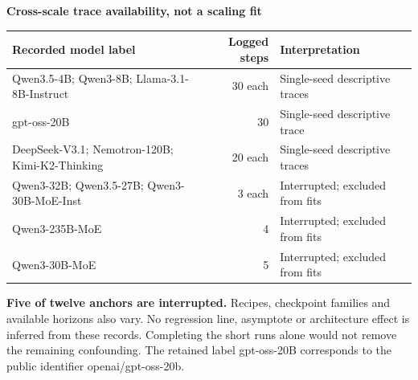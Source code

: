 \documentclass[border=8pt]{standalone}
\begin{document}
\begin{minipage}{15.2cm}\sffamily\small
{\Large\bfseries\color{ink} Cross-scale trace availability, not a scaling fit}\par\medskip
\begin{tabular}{@{}p{8.1cm}rp{4.6cm}@{}}\toprule
Recorded model label & Logged steps & Interpretation\\\midrule
Qwen3.5-4B; Qwen3-8B; Llama-3.1-8B-Instruct & 30 each & Single-seed descriptive traces\\
gpt-oss-20B & 30 & Single-seed descriptive trace\\
DeepSeek-V3.1; Nemotron-120B; Kimi-K2-Thinking & 20 each & Single-seed descriptive traces\\\midrule
Qwen3-32B; Qwen3.5-27B; Qwen3-30B-MoE-Inst & 3 each & Interrupted; excluded from fits\\
Qwen3-235B-MoE & 4 & Interrupted; excluded from fits\\
Qwen3-30B-MoE & 5 & Interrupted; excluded from fits\\\bottomrule
\end{tabular}\par\medskip
\textbf{Five of twelve anchors are interrupted.} Recipes, checkpoint families and available horizons also vary. No regression line, asymptote or architecture effect is inferred from these records. Completing the short runs alone would not remove the remaining confounding. The retained label gpt-oss-20B corresponds to the public identifier openai/gpt-oss-20b.
\end{minipage}
\end{document}
